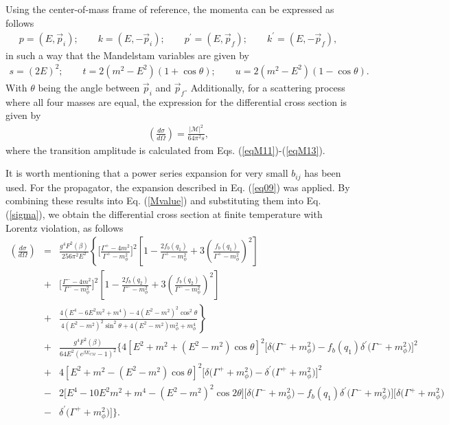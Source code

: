 \documentclass[11pt,showpacs,preprintnumbers,amsmath,amssymb,prd,nofootinbib,superscriptaddress]{revtex4-2}
\begin{document}
{ Using the center-of-mass frame of reference, the momenta can be expressed as follows
\begin{eqnarray}p=(E,\vec{p}_i);\quad\quad k=(E,-\vec{p}_i);\quad\quad p^\prime=(E,\vec{p}_f);\quad\quad k^\prime=(E,-\vec{p}_f),\end{eqnarray}
in such a way that the Mandelstam variables are given by
\begin{eqnarray}s=(2E)^2;\quad\quad t=2(m^2-E^2)(1+\cos{\theta});\quad\quad u=2(m^2-E^2)(1-\cos{\theta}).\end{eqnarray}
With $\theta$ being the angle between $\vec{p}_i$ and $\vec{p}_f$. Additionally, for a scattering process where all four masses are equal, the expression for the differential cross section is given by \cite{peskin}
\begin{eqnarray}\left(\frac{d\sigma}{d\Omega}\right)=\frac{|\mathcal{M}|^2}{64\pi^2 s},\label{sigma}
\end{eqnarray}
where the transition amplitude is calculated from Eqs. (\ref{eqM11})-(\ref{eqM13}).

It is worth mentioning that a power series expansion for very small $b_{ij}$ has been used. For the propagator, the expansion described in Eq. (\ref{eq09}) was applied. By combining these results into Eq. (\ref{Mvalue}) and substituting them into Eq. (\ref{sigma}), we obtain the differential cross section at finite temperature with Lorentz violation, as follows
{\color{red} \begin{eqnarray}\left(\frac{d\sigma}{d\Omega}\right)&=&\frac{g^4F^2(\beta)}{256\pi^2 E^2}\left\{\biggl[\frac{\Gamma^{+}-4m^2}{\Gamma^{+}-m_\phi^2}\biggr]^2\left[1-\frac{2f_b(q_1)}{\Gamma^{+}-m_\phi^2}+3\left(\frac{f_b(q_1)}{\Gamma^{+}-m_\phi^2}\right)^2\right]\right.\nonumber\\&+&\biggl[\frac{\Gamma^{-}-4m^2}{\Gamma^{-}-m_\phi^2}\biggr]^2\left[1-\frac{2f_b(q_2)}{\Gamma^{-}-m_\phi^2}+3\left(\frac{f_b(q_2)}{\Gamma^{-}-m_\phi^2}\right)^2\right]\nonumber\\&+&\left.\frac{4(E^4-6E^2m^2+m^4)-4(E^2-m^2)^2\cos^2{\theta}}{4(E^2-m^2)^2\sin^2{\theta}+4(E^2-m^2)m_\phi^2+m_\phi^4}\right\}\nonumber\\&+&\frac{g^4F^2(\beta)}{64E^2(e^{\beta E_{CM}}-1)^2}\biggl\{4\left[E^2+m^2+(E^2-m^2)\cos{\theta}\right]^2\biggl[\delta\biggl(\Gamma^{-}+m_\phi^2\biggr)-f_b(q_1)\delta^\prime\biggl(\Gamma^{-}+m_\phi^2\biggr)\biggr]^2\nonumber\\&+&4\left[E^2+m^2-(E^2-m^2)\cos{\theta}\right]^2\biggl[\delta\biggl(\Gamma^{+}+m_\phi^2\biggr)-\delta^\prime\biggl(\Gamma^{+}+m_\phi^2\biggr)\biggr]^2\nonumber\\&-&2\biggl[E^4-10E^2m^2+m^4-(E^2-m^2)^2\cos{2\theta}\biggr]\biggl[\delta\biggl(\Gamma^{-}+m_\phi^2\biggr)-f_b(q_1)\delta^\prime\biggl(\Gamma^{-}+m_\phi^2\biggr)\biggr]\biggl[\delta\biggl(\Gamma^{+}+m_\phi^2\biggr)\nonumber\\&-&\delta^\prime\biggl(\Gamma^{+}+m_\phi^2\biggr)\biggr]\biggr\}.\label{eq22}
\end{eqnarray}}

}
\end{document}
